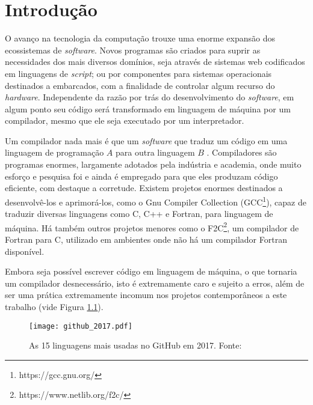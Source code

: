 \chapter{Introdução}
\label{cap:introducao}

O avanço na tecnologia da computação trouxe uma enorme expansão
dos ecossistemas de \textit{software}. Novos programas são criados para
suprir as necessidades dos mais diversos domínios, seja através de sistemas web
codificados em linguagens de \textit{script}; ou por componentes para
sistemas operacionais destinados a embarcados, com a finalidade de controlar algum
recurso do \textit{hardware}. Independente da razão por trás do desenvolvimento
do \textit{software}, em algum ponto seu código será transformado em linguagem
de máquina por um compilador, mesmo que ele seja executado por um
interpretador.

Um compilador nada mais é que um \textit{software} que traduz um código em uma linguagem
de programação $A$ para outra linguagem $B$ \citep{dragonbook}.  Compiladores
são programas enormes, largamente adotados pela indústria e academia, onde muito
esforço e pesquisa foi e ainda é empregado para que eles produzam código
eficiente, com destaque a corretude. Existem projetos enormes destinados a desenvolvê-los e
aprimorá-los, como o Gnu Compiler Collection
(GCC\footnote{https://gcc.gnu.org/}), capaz de traduzir diversas linguagens
como C, C++ e Fortran, para linguagem de máquina. Há também outros projetos
menores como o F2C\footnote{https://www.netlib.org/f2c/}, um compilador de
Fortran para C, utilizado em ambientes onde não há um compilador Fortran
disponível.

Embora seja possível escrever código em linguagem de máquina, o que
tornaria um compilador desnecessário, isto é extremamente caro e
sujeito a erros, além de ser uma prática extremamente
incomum nos projetos contemporâneos a este trabalho \citep{githuboctoverse} (vide
Figura \ref{fig:github_2017}).

\begin{figure}[ht]
 \centering
 \texttt{[image: github\_2017.pdf]}
 \caption{As 15 linguagens mais usadas no GitHub em 2017. Fonte: \cite{githuboctoverse}}
 \label{fig:github_2017}
\end{figure}


